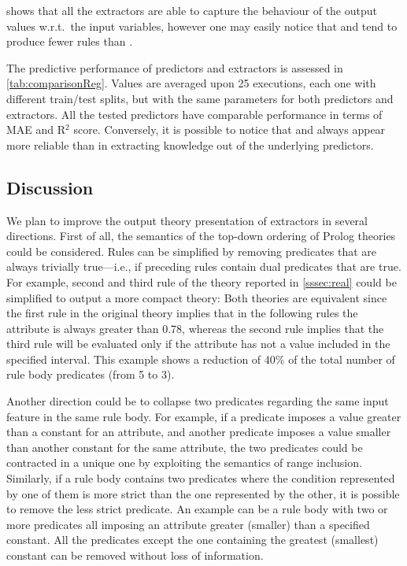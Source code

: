 \documentclass[12pt,a4paper,openright,twoside]{book}
\begin{document}
 shows that all the extractors are able to capture the behaviour of the output values w.r.t.\ the input variables, however one may easily notice that \gridex{} and \cart{} tend to produce fewer rules than \iter{}.

The predictive performance of predictors and extractors is assessed in \cref{tab:comparisonReg}.
%
Values are averaged upon 25 executions, each one with different train/test splits, but with the same parameters for both predictors and extractors.
%
All the tested predictors have comparable performance in terms of MAE and R$^2$ score.
%
Conversely, it is possible to notice that \cart{} and \gridex{} always appear more reliable than \iter{} in extracting knowledge out of the underlying predictors.

\subsection{Discussion}\label{ssec:discussion}

We plan to improve the output theory presentation of \psyke{} extractors in several directions.
%
First of all, the semantics of the top-down ordering of Prolog theories could be considered.
%
Rules can be simplified by removing predicates that are always trivially true---i.e., if preceding rules contain dual predicates that are true.
%
For example, second and third rule of the theory reported in \cref{sssec:real} could be simplified to output a more compact theory:
%
%
Both theories are equivalent since the first rule in the original theory implies that in the following rules the  attribute is always greater than 0.78, whereas the second rule implies that the third rule will be evaluated only if the  attribute has not a value included in the specified interval.
%
This example shows a reduction of 40\% of the total number of rule body predicates (from 5 to 3).

Another direction could be to collapse two predicates regarding the same input feature in the same rule body.
%
For example, if a predicate imposes a value greater than a constant for an attribute, and another predicate imposes a value smaller than another constant for the same attribute, the two predicates could be contracted in a unique one by exploiting the semantics of range inclusion.
%
Similarly, if a rule body contains two predicates where the condition represented by one of them is more strict than the one represented by the other, it is possible to remove the less strict predicate.
%
An example can be a rule body with two or more predicates all imposing an attribute greater (smaller) than a specified constant.
%
All the predicates except the one containing the greatest (smallest) constant can be removed without loss of information.
\end{document}
